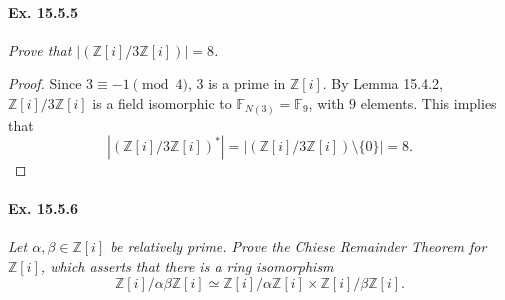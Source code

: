 \documentclass[11pt,a4paper]{article}
\newcommand{\Z}{\mathbb{Z}}
\newcommand{\F}{\mathbb{F}}
\begin{document}
\paragraph{Ex. 15.5.5}{\it  Prove that $\left |  \left (\Z[i]/3 \Z[i] \right) \right | = 8$.
}
\begin{proof} 
Since $3 \equiv -1 \pmod 4$, $3$ is a prime in $\Z[i]$. By Lemma 15.4.2, $\Z[i]/3 \Z[i]$ is a field isomorphic to $\F_{N(3)} = \F_9$, with $9$ elements. This implies that 
$$\left | \left( \Z[i]/3 \Z[i]\right)^* \right | = \left | \left( \Z[i]/3 \Z[i]\right ) \setminus \{0\} \right | = 8.$$
\end{proof}

\paragraph{Ex. 15.5.6}{\it  Let $\alpha,\beta \in \Z[i]$ be relatively prime. Prove the Chiese Remainder Theorem for $\Z[i]$, which asserts that there is a ring isomorphism
$$\Z[i]/\alpha\beta \Z[i] \simeq \Z[i]/ \alpha \Z[i] \times \Z[i]/\beta \Z[i].$$
}
\end{document}
